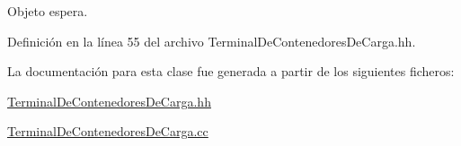 Objeto espera. 



Definición en la línea 55 del archivo Terminal\+De\+Contenedores\+De\+Carga.\+hh.



La documentación para esta clase fue generada a partir de los siguientes ficheros\+:\begin{DoxyCompactItemize}
\item 
\hyperlink{_terminal_de_contenedores_de_carga_8hh}{Terminal\+De\+Contenedores\+De\+Carga.\+hh}\item 
\hyperlink{_terminal_de_contenedores_de_carga_8cc}{Terminal\+De\+Contenedores\+De\+Carga.\+cc}\end{DoxyCompactItemize}
